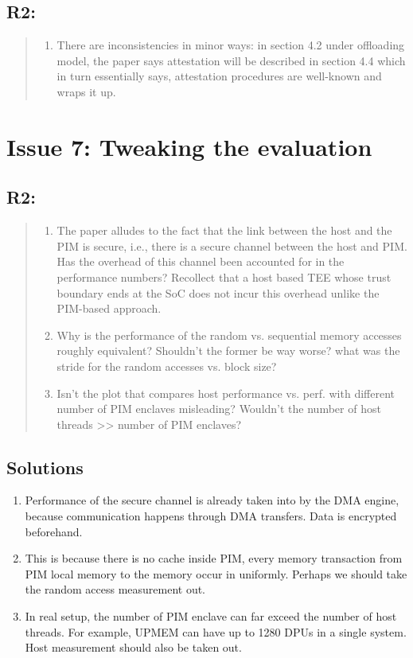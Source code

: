 \documentclass[11pt]{article}
\begin{document}
\subsection{R2:}
\label{sec:org81d5389}
\begin{quote}
\begin{enumerate}
\item There are inconsistencies in minor ways: in section 4.2 under offloading model, the paper says attestation will be described in section 4.4 which in turn essentially says, attestation procedures are well-known and wraps it up.
\end{enumerate}
\end{quote}
\section{Issue 7: Tweaking the evaluation}
\label{sec:org3a1838f}
\subsection{R2:}
\label{sec:org46fbf99}
\begin{quote}
\begin{enumerate}
\item The paper alludes to the fact that the link between the host and the PIM is secure, i.e., there is a secure channel between the host and PIM. Has the overhead of this channel been accounted for in the performance numbers? Recollect that a host based TEE whose trust boundary ends at the SoC does not incur this overhead unlike the PIM-based approach.
\item Why is the performance of the random vs. sequential memory accesses roughly equivalent? Shouldn't the former be way worse? what was the stride for the random accesses vs. block size?
\item Isn't the plot that compares host performance vs. perf. with different number of PIM enclaves misleading? Wouldn't the number of host threads >> number of PIM enclaves?
\end{enumerate}
\end{quote}
\subsection{Solutions}
\label{sec:org41ab339}
\begin{enumerate}
\item Performance of the secure channel is already taken into by the DMA engine, because communication happens through DMA transfers. Data is encrypted beforehand.
\item This is because there is no cache inside PIM, every memory transaction from PIM local memory to the memory occur in uniformly. Perhaps we should take the random access measurement out.
\item In real setup, the number of PIM enclave can far exceed the number of host threads. For example, UPMEM can have up to 1280 DPUs in a single system. Host measurement should also be taken out.
\end{enumerate}
\end{document}
